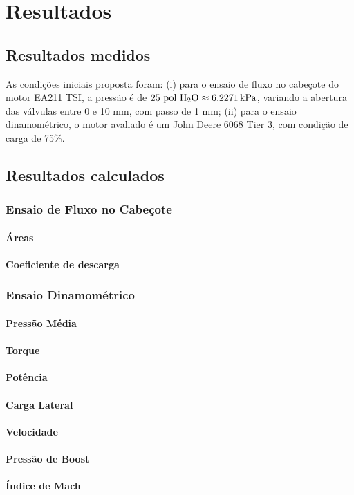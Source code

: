\chapter{Resultados}

\section{Resultados medidos}

As condições iniciais proposta foram: (i) para o ensaio de fluxo no cabeçote do motor EA211 TSI, a pressão é de $25 \text{ pol \ce{H2O}}  \approx  \SI{6,2271}{kPa}$, variando a abertura das válvulas entre 0 e 10 mm, com passo de 1 mm; (ii) para o ensaio dinamométrico, o motor avaliado é um John Deere 6068 Tier 3, com condição de carga de 75\%.

\section{Resultados calculados}

\subsection{Ensaio de Fluxo no Cabeçote}

\subsubsection*{Áreas}

\subsubsection*{Coeficiente de descarga}


\subsection{Ensaio Dinamométrico}

\subsubsection*{Pressão Média}

\subsubsection*{Torque}

\subsubsection*{Potência}

\subsubsection*{Carga Lateral}

\subsubsection*{Velocidade}

\subsubsection*{Pressão de Boost}

\subsubsection*{Índice de Mach}